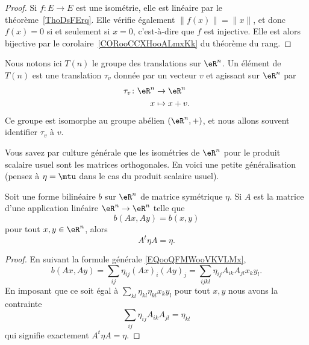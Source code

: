 \begin{proof}
	Si \( f\colon E\to E\) est une isométrie, elle est linéaire par le théorème~\ref{ThoDsFErq}. Elle vérifie également \( \| f(x) \|=\| x \|\), et donc \( f(x)=0\) si et seulement si \( x=0\), c'est-à-dire que \( f\) est injective. Elle est alors bijective par le corolaire~\ref{CORooCCXHooALmxKk} du théorème du rang.
\end{proof}

Nous notons ici \( T(n)\) le groupe des translations sur \( \eR^n\). Un élément de \( T(n)\) est une translation \( \tau_v\) donnée par un vecteur \( v\) et agissant sur \( \eR^n\) par
\begin{equation}
	\begin{aligned}
		\tau_v\colon \eR^n & \to \eR^{n}  \\
		x                  & \mapsto x+v.
	\end{aligned}
\end{equation}
Ce groupe est isomorphe au groupe abélien \( (\eR^n,+)\), et nous allons souvent identifier \( \tau_v\) à \( v\).

Vous savez par culture générale que les isométries de \( \eR^n\) pour le produit scalaire usuel sont les matrices orthogonales. En voici une petite généralisation (pensez à \( \eta=\mtu\) dans le cas du produit scalaire usuel).
\begin{proposition}     \label{PROPooSYQMooEnZFdp}
	Soit une forme bilinéaire \( b\) sur \( \eR^n\) de matrice symétrique \( \eta\). Si \( A\) est la matrice d'une application linéaire \( \eR^n\to \eR^n\) telle que
	\begin{equation}
		b(Ax,Ay)=b(x,y)
	\end{equation}
	pour tout \( x,y\in\eR^n\), alors
	\begin{equation}
		A^t\eta A=\eta.
	\end{equation}
\end{proposition}

\begin{proof}
	En suivant la formule générale \eqref{EQooQFMWooVKVLMx},
	\begin{equation}
		b(Ax,Ay)=\sum_{ij} \eta_{ij} (Ax)_i(Ay)_j=\sum_{ijkl}\eta_{ij}A_{ik}A_{jl}x_ky_l.
	\end{equation}
	En imposant que ce soit égal à \( \sum_{kl}\eta_{kl}\eta_{kl}x_ky_l\) pour tout \( x,y\) nous avons la contrainte
	\begin{equation}
		\sum_{ij}\eta_{ij}A_{ik}A_{jl}=\eta_{kl}
	\end{equation}
	qui signifie exactement \( A^t\eta A=\eta\).
\end{proof}

